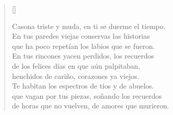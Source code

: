 \documentclass{article}
\newcommand{\attrib}[1]{%
    \nopagebreak{\raggedleft\footnotesize #1\par}
}
\begin{document}
\begin{verse}[\textwidth]

Casona triste y muda, en ti se duerme el tiempo.\\
En tus paredes viejas conservas las historias\\
que ha poco repetían los labios que se fueron.\\
En tus rincones yacen perdidos, los recuerdos\\
de los felices días en que aún palpitaban,\\
henchidos de cariño, corazones ya viejos.\\
Te habitan los espectros de tíos y de abuelos.\\
que vagan por tus piezas, soñando los recuerdos\\
de horas que no vuelven, de amores que murieron.


\end{verse}
\end{document}
